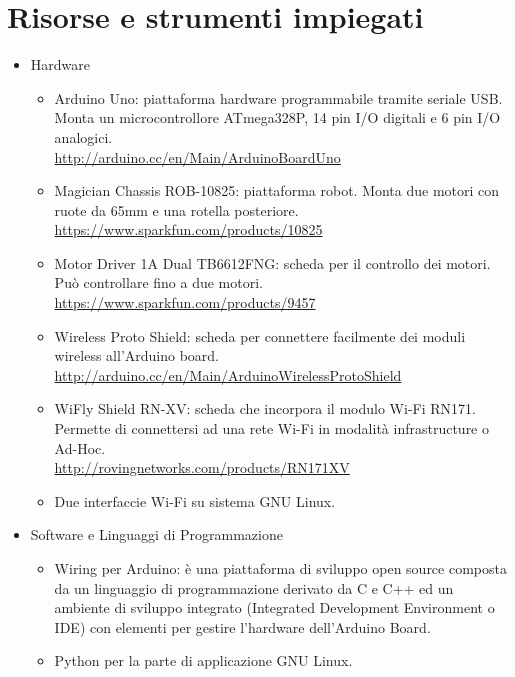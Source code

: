 \documentclass[a4paper,11pt]{report}
\begin{document}
\section{Risorse e strumenti impiegati}
\begin{itemize}
  \item Hardware
  \begin {itemize}
    \item Arduino Uno: piattaforma hardware programmabile tramite seriale USB. 
      Monta un microcontrollore ATmega328P, 14 pin I/O digitali e 6 pin I/O analogici.\\
      \url{http://arduino.cc/en/Main/ArduinoBoardUno} 
    \item Magician Chassis ROB-10825: piattaforma robot. Monta due motori con ruote da 65mm e una rotella posteriore.\\
        \url{https://www.sparkfun.com/products/10825}
    \item Motor Driver 1A Dual TB6612FNG: scheda per il controllo dei motori. Può controllare fino a due motori.\\
        \url{https://www.sparkfun.com/products/9457}
    \item Wireless Proto Shield: scheda per connettere facilmente dei moduli wireless all'Arduino board.\\
        \url{http://arduino.cc/en/Main/ArduinoWirelessProtoShield}
    \item WiFly Shield RN-XV: scheda che incorpora il modulo Wi-Fi RN171. Permette di connettersi ad una rete Wi-Fi 
        in modalità infrastructure o Ad-Hoc.\\
        \url{http://rovingnetworks.com/products/RN171XV}
    \item Due interfaccie Wi-Fi su sistema GNU Linux.  
  \end {itemize}
  \item Software e Linguaggi di Programmazione
  \begin {itemize}
    \item Wiring per Arduino: è una piattaforma di sviluppo open source composta da un linguaggio di programmazione derivato da C e C++ ed un ambiente di sviluppo integrato (Integrated Development Environment o IDE) con elementi per gestire l'hardware dell'Arduino Board.
    \item Python per la parte di applicazione GNU Linux.
  \end{itemize}
  
\end{itemize}
\end{document}
